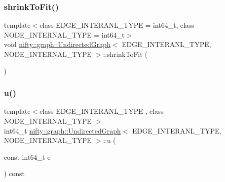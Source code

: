 \subsubsection{\texorpdfstring{shrink\+To\+Fit()}{shrinkToFit()}}
{\footnotesize\ttfamily template$<$class E\+D\+G\+E\+\_\+\+I\+N\+T\+E\+R\+A\+N\+L\+\_\+\+T\+Y\+PE = int64\+\_\+t, class N\+O\+D\+E\+\_\+\+I\+N\+T\+E\+R\+N\+A\+L\+\_\+\+T\+Y\+PE = int64\+\_\+t$>$ \\
void \hyperlink{classnifty_1_1graph_1_1UndirectedGraph}{nifty\+::graph\+::\+Undirected\+Graph}$<$ E\+D\+G\+E\+\_\+\+I\+N\+T\+E\+R\+A\+N\+L\+\_\+\+T\+Y\+PE, N\+O\+D\+E\+\_\+\+I\+N\+T\+E\+R\+N\+A\+L\+\_\+\+T\+Y\+PE $>$\+::shrink\+To\+Fit (\begin{DoxyParamCaption}{ }\end{DoxyParamCaption})\hspace{0.3cm}{\ttfamily [inline]}}

\mbox{\label{classnifty_1_1graph_1_1UndirectedGraph_ad615dcee7447b5663be51ff5725943d6}} 
\subsubsection{\texorpdfstring{u()}{u()}}
{\footnotesize\ttfamily template$<$class E\+D\+G\+E\+\_\+\+I\+N\+T\+E\+R\+A\+N\+L\+\_\+\+T\+Y\+PE , class N\+O\+D\+E\+\_\+\+I\+N\+T\+E\+R\+N\+A\+L\+\_\+\+T\+Y\+PE $>$ \\
int64\+\_\+t \hyperlink{classnifty_1_1graph_1_1UndirectedGraph}{nifty\+::graph\+::\+Undirected\+Graph}$<$ E\+D\+G\+E\+\_\+\+I\+N\+T\+E\+R\+A\+N\+L\+\_\+\+T\+Y\+PE, N\+O\+D\+E\+\_\+\+I\+N\+T\+E\+R\+N\+A\+L\+\_\+\+T\+Y\+PE $>$\+::u (\begin{DoxyParamCaption}\item[{const int64\+\_\+t}]{e }\end{DoxyParamCaption}) const}

\mbox{\label{classnifty_1_1graph_1_1UndirectedGraph_a270b13442535d2407d9b0741748d5fb0}} 
